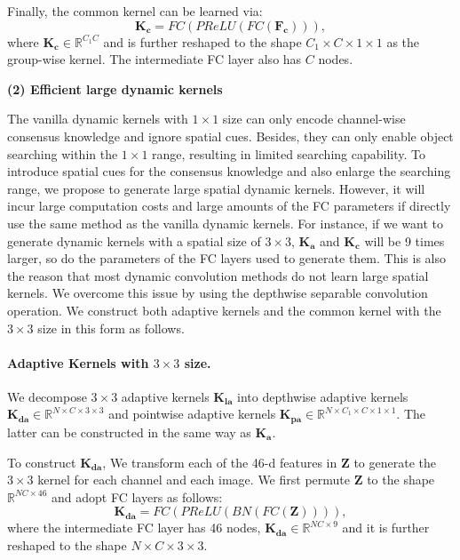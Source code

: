 \documentclass[10pt,twocolumn,letterpaper]{article}
\begin{document}
Finally, the common kernel can be learned via:
\begin{equation} \label{PoCoKernel}
\bm{K_c}=FC(PReLU(FC(\bm{F_c}))),
\end{equation}
where $\bm{K_{c}}\in{\mathbb{R}^{C_1C}}$ and is further reshaped to the shape $C_1 \times {C \times {1 \times 1}}$ as the group-wise kernel. The intermediate FC layer also has $C$ nodes.

\vspace{3mm}
\noindent\textbf{(2) Efficient large dynamic kernels}
\vspace{2mm}

The vanilla dynamic kernels with $1 \times 1$ size can only encode channel-wise consensus knowledge and ignore spatial cues. Besides, they can only enable object searching within the $1 \times 1$ range, resulting in limited searching capability. To introduce spatial cues for the consensus knowledge and also enlarge the searching range, we propose to generate large spatial dynamic kernels. However, it will incur large computation costs and large amounts of the FC parameters if directly use the same method as the vanilla dynamic kernels. For instance, if we want to generate dynamic kernels with a spatial size of $3 \times 3$, $\bm{K_a}$ and $\bm{K_c}$ will be 9 times larger, so do the parameters of the FC layers used to generate them.
This is also the reason that most dynamic convolution methods do not learn large spatial kernels. We overcome this issue by using the depthwise separable convolution \cite{howard2017mobilenets} operation. We construct both adaptive kernels and the common kernel with the $3 \times 3$ size in this form as follows.

\vspace{-3mm}
\paragraph{Adaptive Kernels with ${3 \times 3}$ size.}
We decompose $3 \times 3$ adaptive kernels $\bm{K_{la}}$ into depthwise adaptive kernels $\bm{K_{da}}\in{\mathbb{R}^{N \times{C\times{3\times 3}}}}$ and pointwise adaptive kernels $\bm{K_{pa}}\in{\mathbb{R}^{N \times{C_1\times{C\times{1\times 1}}}}}$. The latter can be constructed in the same way as $\bm{K_a}$.

To construct $\bm{K_{da}}$, We transform each of the 46-d features in $\bm{Z}$ to generate the $3 \times 3$ kernel for each channel and each image. We first permute $\bm{Z}$ to the shape $\mathbb{R}^{NC\times 46}$ and adopt FC layers as follows:
\begin{equation} \label{1x1AdaKernelatt}
\bm{K_{da}}=FC(PReLU(BN(FC(\bm{Z})))),
\end{equation}
where the intermediate FC layer has 46 nodes, $\bm{K_{da}}\in{\mathbb{R}^{NC \times 9}}$ and it is further reshaped to the shape $N \times{C \times {3 \times 3}}$.
\end{document}
